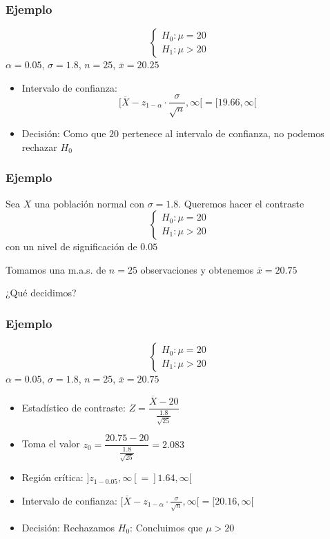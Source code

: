 \documentclass[12pt,t]{beamer}\usepackage[]{graphicx}\usepackage[]{color}
\renewcommand{\emph}[1]{{\color{red}#1}}
\theoremstyle{plain}
\theoremstyle{definition}
\begin{document}
\begin{frame}
\frametitle{Ejemplo}
$$
\left\{\begin{array}{l}
H_{0}:\mu=20\\ H_{1}:\mu>20
\end{array}
\right.
$$
$\alpha=0.05$, $\sigma=1.8$, $n=25$, $\overline{x}=20.25$
\medskip

\begin{itemize}

\item \emph{Intervalo de confianza}: 
$$
\Big[\overline{X}-z_{1-\alpha}\cdot\frac{\sigma}{\sqrt{n}},\infty\Big[=[19.66,\infty[
$$
\medskip

\item \emph{Decisión}: Como que $20$ pertenece  al intervalo de confianza, no podemos rechazar   $H_0$
\end{itemize}

\end{frame}

\begin{frame}
\frametitle{Ejemplo}
Sea $X$ una población normal con $\sigma=1.8$. Queremos hacer el contraste
$$
\left\{\begin{array}{l}
H_{0}:\mu=20\\ H_{1}:\mu>20
\end{array}
\right.
$$
con un nivel   de significación   de $0.05$
\medskip

Tomamos una m.a.s. de $n=25$ observaciones y obtenemos  $\overline{x}=20.75$
\medskip

¿Qué decidimos?
\end{frame}


\begin{frame}
\frametitle{Ejemplo}
\vspace*{-4ex}

$$
\left\{\begin{array}{l}
H_{0}:\mu=20\\ H_{1}:\mu>20
\end{array}
\right.
$$
$\alpha=0.05$, $\sigma=1.8$, $n=25$, $\overline{x}=20.75$
\medskip

\begin{itemize}
\item \emph{Estadístico de contraste}: $Z=
\dfrac{\overline{X}-20}{\frac{1.8}{\sqrt{25}}}$
\medskip

\item Toma el valor $z_0=\dfrac{20.75-20}{\frac{1.8}{\sqrt{25}}}=2.083$

\item \emph{Región crítica}: $]z_{1-0.05},\infty[=]1.64,\infty[$
\medskip

\item \emph{Intervalo de confianza}: $[\overline{X}-z_{1-\alpha}\cdot\frac{\sigma}{\sqrt{n}},\infty[=[20.16,\infty[$
\medskip

\item \emph{Decisión}: Rechazamos  $H_0$: Concluimos  que $\mu>20$
\end{itemize}

\end{frame}
\end{document}
